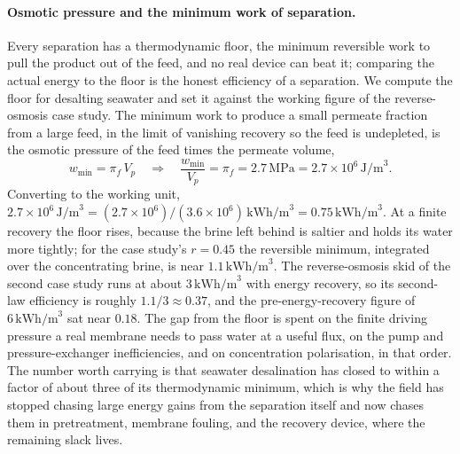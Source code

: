 \paragraph{Osmotic pressure and the minimum work of separation.} Every
separation has a thermodynamic floor, the minimum reversible work to pull the
product out of the feed, and no real device can beat it; comparing the actual
energy to the floor is the honest efficiency of a separation. We compute the
floor for desalting seawater and set it against the working figure of the
reverse-osmosis case study. The minimum work to produce a small permeate
fraction from a large feed, in the limit of vanishing recovery so the feed is
undepleted, is the osmotic pressure of the feed times the permeate volume,
\[
w_{\min} = \pi_f\,V_p \quad\Rightarrow\quad
\frac{w_{\min}}{V_p} = \pi_f = 2.7\,\text{MPa} = 2.7\times 10^{6}\,
\text{J/m}^3.
\]
Converting to the working unit, $2.7\times 10^{6}\,\text{J/m}^3 =
(2.7\times 10^{6})/(3.6\times 10^{6})\,\text{kWh/m}^3 = 0.75\,\text{kWh/m}^3$.
At a finite recovery the floor rises, because the brine left behind is
saltier and holds its water more tightly; for the case study's $r = 0.45$ the
reversible minimum, integrated over the concentrating brine, is near
$1.1\,\text{kWh/m}^3$. The reverse-osmosis skid of the second case study runs
at about $3\,\text{kWh/m}^3$ with energy recovery, so its second-law
efficiency is roughly $1.1/3 \approx 0.37$, and the pre-energy-recovery
figure of $6\,\text{kWh/m}^3$ sat near $0.18$. The gap from the floor is
spent on the finite driving pressure a real membrane needs to pass water at a
useful flux, on the pump and pressure-exchanger inefficiencies, and on
concentration polarisation, in that order. The number worth carrying is that
seawater desalination has closed to within a factor of about three of its
thermodynamic minimum, which is why the field has stopped chasing large
energy gains from the separation itself and now chases them in pretreatment,
membrane fouling, and the recovery device, where the remaining slack lives.

